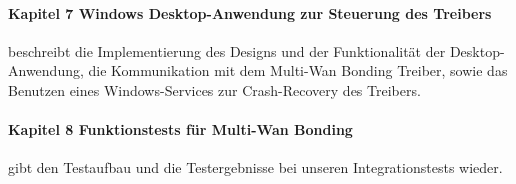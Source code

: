 \paragraph{Kapitel 7 Windows Desktop-Anwendung zur Steuerung des Treibers}beschreibt die Implementierung des Designs und der Funktionalität der Desktop-Anwendung, die Kommunikation mit dem Multi-Wan Bonding Treiber, sowie das Benutzen eines Windows-Services zur Crash-Recovery des Treibers.
\paragraph{Kapitel 8 Funktionstests für Multi-Wan Bonding}gibt den Testaufbau und die Testergebnisse bei unseren Integrationstests wieder.